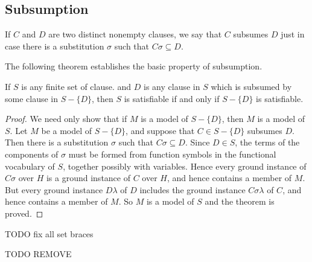 \documentclass[8pt]{extarticle}
\providecommand{\customgenericname}{}
\newcommand{\newcustomtheorem}[2]{%
  \newenvironment{#1}[1]
  {%
   \renewcommand\customgenericname{#2}%
   \renewcommand\theinnercustomgeneric{##1}%
   \innercustomgeneric
  }
  {\endinnercustomgeneric}
}
\begin{document}
\subsection{Subsumption}
If $C$ and $D$ are two distinct nonempty clauses, we say 
that $C$ subsumes $D$ just in case there is a substitution $\sigma$ such that $C\sigma\subseteq D$.

The following theorem establishes the basic property of subsumption. 

\newcustomtheorem{p16theorem}{}
\begin{p16theorem}{Subsumption Theorem}
If $S$ is any finite set of clause. and $D$ is any clause in $S$ which is subsumed by some clause in $S - \{D\}$, then $S$ is satisfiable if and only if $S - \{D\}$ is satisfiable.
\end{p16theorem}
\begin{proof}
We need only show that if $M$ is a model of $S - \{D\}$, then $M$ is a model of $S$. Let $M$ be a model of $S - \{D\}$, and suppose that $C \in S - \{D\}$ subsumes $D$. Then there is a substitution $\sigma$ such that $C\sigma\subseteq D$. Since $D \in S$, the 
terms of the components of $\sigma$ must be formed from function symbols in the functional vocabulary of $S$, together possibly with variables. Hence every ground instance of $C\sigma$ over $H$ is a ground instance of $C$ over $H$, and hence contains a 
member of $M$. But every ground instance $D\lambda$ of $D$ includes the ground instance $C\sigma\lambda$ of $C$, and hence contains a member of $M$. So $M$ is a model of $S$ and the theorem is proved. 

\end{proof}

\newpage

TODO fix all set braces

TODO REMOVE
\cite{church_1936}
\cite{davis_1960}
\cite{friedman_1963}
\cite{gilmore_1960}
\cite{robinson_1963}



\end{document}
